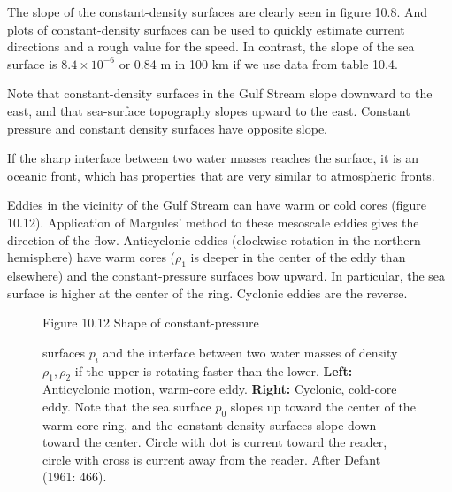 The slope of the constant-density surfaces are clearly seen in figure
10.8. And plots of constant-density surfaces can be used to quickly
estimate current directions and a rough value for the speed. In
contrast, the slope of the sea surface is $8.4 \times 10^{-6}$ or 0.84
m in 100 km if we use data from table 10.4.

Note that constant-density surfaces in the Gulf Stream slope downward to the east, and that
sea-surface topography slopes upward to the east. Constant pressure
and constant density surfaces have opposite slope.

If the sharp interface between two water masses reaches the surface,
it is an oceanic front, which has properties that are very similar to
atmospheric fronts.

Eddies in the vicinity of the Gulf Stream
can have warm or cold cores (figure 10.12). Application of Margules'
method to these mesoscale eddies gives the
direction of the flow. Anticyclonic eddies (clockwise rotation in the
northern hemisphere) have warm cores ($\rho_1$ is deeper in the center
of the eddy than elsewhere) and the constant-pressure surfaces bow
upward. In particular, the sea surface is higher at the center of the
ring. Cyclonic eddies are the reverse.

\begin{figure}[h!]
\vspace{-1ex}
\footnotesize
Figure 10.12 Shape of constant-pressure \rule{0mm}{4ex}surfaces $p_i$
and the interface between two water masses of density $\rho_1, \rho_2$
if the upper is rotating faster than the lower.  \textbf{Left:}
Anticyclonic motion, warm-core eddy. \textbf{Right:} Cyclonic,
cold-core eddy. Note that the sea surface $p_0$ slopes up toward the
center of the warm-core ring, and the constant-density surfaces slope
down toward the center. Circle with dot is current toward the reader,
circle with cross is current away from the reader. After Defant (1961: 466).
\label{fig:rings}
\vspace{-4ex}
\end{figure}

